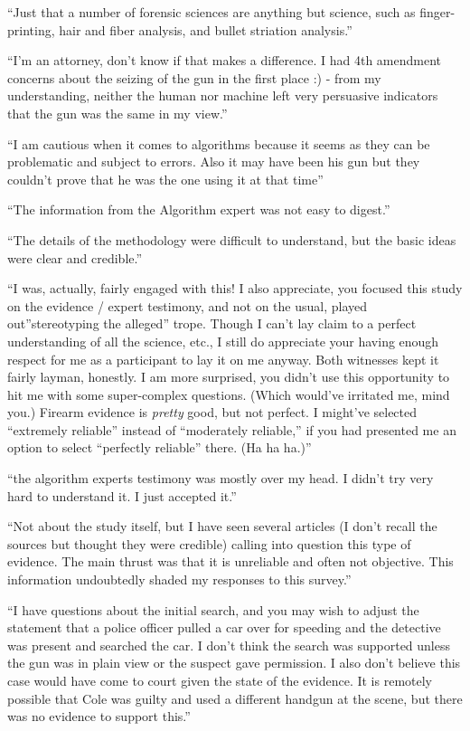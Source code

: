 \documentclass[print]{nuthesis}
\begin{document}
``Just that a number of forensic sciences are anything but science, such as finger-printing, hair and fiber analysis, and bullet striation analysis.''

``I'm an attorney, don't know if that makes a difference. I had 4th amendment concerns about the seizing of the gun in the first place :) - from my understanding, neither the human nor machine left very persuasive indicators that the gun was the same in my view.''

``I am cautious when it comes to algorithms because it seems as they can be problematic and subject to errors. Also it may have been his gun but they couldn't prove that he was the one using it at that time''

``The information from the Algorithm expert was not easy to digest.''

``The details of the methodology were difficult to understand, but the basic ideas were clear and credible.''

``I was, actually, fairly engaged with this! I also appreciate, you focused this study on the evidence / expert testimony, and not on the usual, played out''stereotyping the alleged'' trope. Though I can't lay claim to a perfect understanding of all the science, etc., I still do appreciate your having enough respect for me as a participant to lay it on me anyway. Both witnesses kept it fairly layman, honestly. I am more surprised, you didn't use this opportunity to hit me with some super-complex questions. (Which would've irritated me, mind you.) Firearm evidence is \emph{pretty} good, but not perfect. I might've selected ``extremely reliable'' instead of ``moderately reliable,'' if you had presented me an option to select ``perfectly reliable'' there. (Ha ha ha.)''

``the algorithm experts testimony was mostly over my head. I didn't try very hard to understand it. I just accepted it.''

``Not about the study itself, but I have seen several articles (I don't recall the sources but thought they were credible) calling into question this type of evidence. The main thrust was that it is unreliable and often not objective. This information undoubtedly shaded my responses to this survey.''

``I have questions about the initial search, and you may wish to adjust the statement that a police officer pulled a car over for speeding and the detective was present and searched the car. I don't think the search was supported unless the gun was in plain view or the suspect gave permission. I also don't believe this case would have come to court given the state of the evidence. It is remotely possible that Cole was guilty and used a different handgun at the scene, but there was no evidence to support this.''
\end{document}
